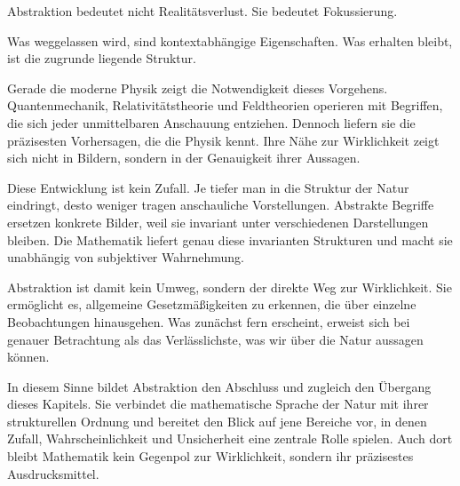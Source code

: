 \begin{DidacticBox}
	\label{box:abstraktion}
	Abstraktion bedeutet nicht Realitätsverlust.  
	Sie bedeutet Fokussierung.
	
	Was weggelassen wird, sind kontextabhängige Eigenschaften.  
	Was erhalten bleibt, ist die zugrunde liegende Struktur.
\end{DidacticBox}

Gerade die moderne Physik zeigt die Notwendigkeit dieses Vorgehens. Quantenmechanik, Relativitätstheorie und Feldtheorien operieren mit Begriffen, die sich jeder unmittelbaren Anschauung entziehen. Dennoch liefern sie die präzisesten Vorhersagen, die die Physik kennt. Ihre Nähe zur Wirklichkeit zeigt sich nicht in Bildern, sondern in der Genauigkeit ihrer Aussagen.

Diese Entwicklung ist kein Zufall. Je tiefer man in die Struktur der Natur eindringt, desto weniger tragen anschauliche Vorstellungen. Abstrakte Begriffe ersetzen konkrete Bilder, weil sie invariant unter verschiedenen Darstellungen bleiben. Die Mathematik liefert genau diese invarianten Strukturen und macht sie unabhängig von subjektiver Wahrnehmung.

Abstraktion ist damit kein Umweg, sondern der direkte Weg zur Wirklichkeit. Sie ermöglicht es, allgemeine Gesetzmäßigkeiten zu erkennen, die über einzelne Beobachtungen hinausgehen. Was zunächst fern erscheint, erweist sich bei genauer Betrachtung als das Verlässlichste, was wir über die Natur aussagen können.

In diesem Sinne bildet Abstraktion den Abschluss und zugleich den Übergang dieses Kapitels. Sie verbindet die mathematische Sprache der Natur mit ihrer strukturellen Ordnung und bereitet den Blick auf jene Bereiche vor, in denen Zufall, Wahrscheinlichkeit und Unsicherheit eine zentrale Rolle spielen. Auch dort bleibt Mathematik kein Gegenpol zur Wirklichkeit, sondern ihr präzisestes Ausdrucksmittel.

